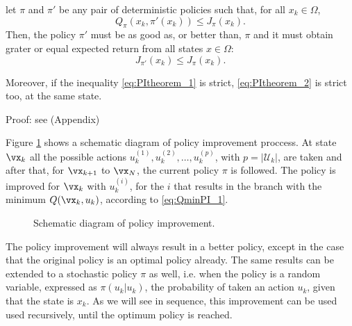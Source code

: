 \begin{theorem} \label{teo:polImprov}
  let  $\pi$ and $\pi'$ be any pair of deterministic policies such that, for all $x_k \in \Omega$,
  \begin{equation}
    Q_\pi(x_k,\pi'(x_k)) \leq J_\pi(x_k)
  \label{eq:PItheorem_1}.
  \end{equation}
  Then, the policy $\pi'$ must be as good as, or better than, $\pi$ and it must obtain grater or equal expected return from all states $x \in \Omega$:
  \begin{equation}
    J_{\pi'}(x_k) \leq J_\pi(x_k)
  \label{eq:PItheorem_2}.
  \end{equation}
  
  Moreover, if the inequality \eqref{eq:PItheorem_1} is strict, \eqref{eq:PItheorem_2} is strict too, at the same state.
\end{theorem}

 Proof: see (Appendix)


Figure  \ref{fig:PI_fig} shows a schematic diagram of policy improvement proccess. At state $\vx_k$ all the possible actions $u_k^{(1)}, u_k^{(2)}, \dots, u_k^{(p)}$, with $p = |\mathcal{U}_k|$, are taken and after that, for $\vx_{k+1}$ to $\vx_N$, the current policy $\pi$ is followed. 
The policy is improved for $\vx_k$ with $u_k^{(i)}$, for the $i$ that results in the branch with the minimum $Q(\vx_k,u_k)$, according to \eqref{eq:QminPI_1}. 

\begin{figure}[h]
    \centering
    
    \caption{Schematic diagram of policy improvement. }
    \label{fig:PI_fig}
  \end{figure} 

The policy improvement will always result in a better policy, except in the case that the original policy is an optimal policy already.
The same results can be extended to a stochastic policy $\pi$ as well, i.e. when the policy is a random variable, expressed as $\pi(u_k|u_k)$, the probability of taken an action $u_k$, given that the state is $x_k$.
As we will see in sequence, this improvement can be used used recursively, until the optimum policy is reached.

